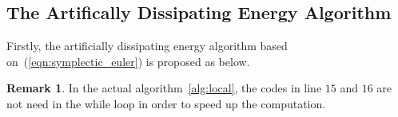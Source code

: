\documentclass[11pt,fceqn]{article}
\numberwithin{equation}{section}
\theoremstyle{definition}
\newtheorem{rem}[thm]{Remark}
\begin{document}
\subsection{The Artifically Dissipating Energy Algorithm}
Firstly, the artificially dissipating energy algorithm based on~(\ref{eqn:symplectic_euler}) is proposed as below.
\begin{algorithm}[H]
\begin{algorithmic}[1]
      \Else
\EndIf
  
\EndWhile
\end{algorithmic}
\caption{Artifically Dissipating Energy Algorithm}
\label{alg:local}
\end{algorithm}

\begin{rem}
In the actual algorithm~\ref{alg:local}, the codes in line $15$ and $16$ are not need in the while loop in order to  speed up the computation.
\end{rem}
\end{document}
